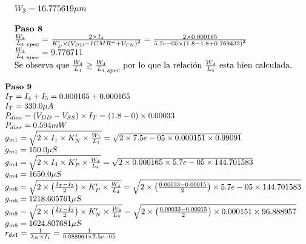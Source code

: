 \begin{equation*}
\begin{array}{l l}
		W_{3}  =  16.775619  \mu m \\
		\\
		\textbf{Paso 8} \\
		\frac{W_4}{L_4}_{spec} = \frac{2\times I_{4}}{K'_{P} \times \left( V_{DD} - ICMR^{+} + V_{TN} \right) ^2} = \frac{2 \times  0.000165 }{ 5.7e-05  \times \left(  1.8  -  1.8  +  0.769432  \right) ^2} \\
		\frac{W_4}{L_4}_{spec} =  9.776711  \\
		\text{Se observa que } \frac{W_4}{L_4} \geq \frac{W_4}{L_4}_{spec} \text{ por lo que la relación } \frac{W_4}{L_4} \text{ esta bien calculada.} \\
	\end{array}
\end{equation*}

\begin{equation*}
	\begin{array}{l l}
		\textbf{Paso 9} \\
		I_{T} = I_{4} + I_{5} =  0.000165 + 0.000165  \\
		I_{T} =  330.0  \mu A \\
		P_{diss} = (V_{DD} - V_{SS}) \times I_{T} = ( 1.8 - 0 ) \times  0.00033  \\
		P_{diss} =  0.594  mW \\
		g_{m1} = \sqrt{2 \times I_{1} \times K'_{N} \times \frac{W_1}{L_1}} = \sqrt{2 \times  7.5e-05  \times  0.000151  \times  0.99091 } \\
		g_{m1} =  150.0  \mu S \\
		g_{m4} = \sqrt{2 \times I_{4} \times K'_{P} \times \frac{W_4}{L_4}} = \sqrt{2 \times  0.000165  \times  5.7e-05  \times  144.701583 } \\
		g_{m4} =  1650.0  \mu S \\
		g_{m6} = \sqrt{2 \times \left( \frac{I_{T} - I_{3}}{2} \right) \times K'_{P} \times \frac{W_4}{L_4}} = \sqrt{2 \times \left( \frac{ 0.00033  -  0.00015 }{2} \right) \times  5.7e-05  \times  144.701583 } \\
		g_{m6} =  1218.605761  \mu S \\
		g_{m8} = \sqrt{2 \times \left( \frac{I_{T} - I_{3}}{2} \right) \times K'_{N} \times \frac{W_8}{L_8}} = \sqrt{2 \times \left( \frac{ 0.00033  -  0.00015 }{2} \right) \times  0.000151  \times  96.888957 } \\
		g_{m8} =  1624.807681  \mu S \\
		r_{ds1} = \frac{1}{\lambda_{N} \times I_{1}} = \frac{1}{ 0.088964  \times  7.5e-05 } \\

\end{array}
\end{equation*}
